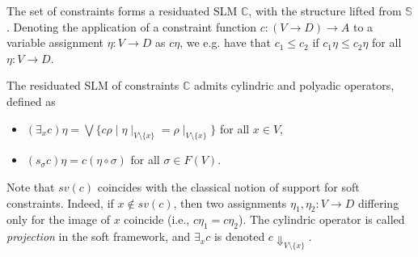 \documentclass{llncs}
\begin{document}
The set of constraints forms a residuated SLM $\mathbb{C}$, with the structure
lifted from ${\mathbb S}$. Denoting the application of a
constraint function $c:(V \rightarrow D) \rightarrow A$ to a variable
assignment $\eta:V\rightarrow D$ as $c\eta$, we e.g. have that 
$c_1 \leq c_2$ if $c_1\eta\leq c_2\eta$ for all $\eta: V \rightarrow D$.

\begin{lemma}
	The residuated SLM of constraints $\mathbb{C}$ admits cylindric and polyadic operators, defined as
	\begin{itemize}
		\item  $(\exists_x c) \eta = \bigvee \{c \rho \mid \eta\mid_{V \setminus \{x\}} = 
		\rho\mid_{V \setminus \{x\}}\}$ for all $x \in V$,
		\item  $(s_\sigma c) \eta = c (\eta \circ \sigma)$ for all $\sigma \in F(V)$.
	\end{itemize}
\end{lemma}

\begin{remark}
Note that $sv(c)$ coincides with the classical notion of support
for soft constraints. Indeed, if $x\not \in sv(c)$, then two
assignments $\eta_1, \eta_2: V \rightarrow D$ differing only for the
image of $x$ coincide (i.e., $c\eta_1 =
c\eta_2$).
%
The cylindric operator is called \emph{projection} 
in the soft framework, and $\exists_x c$ is denoted 
$c\Downarrow_{V\setminus \{x\}}$.
\end{remark}
\end{document}
